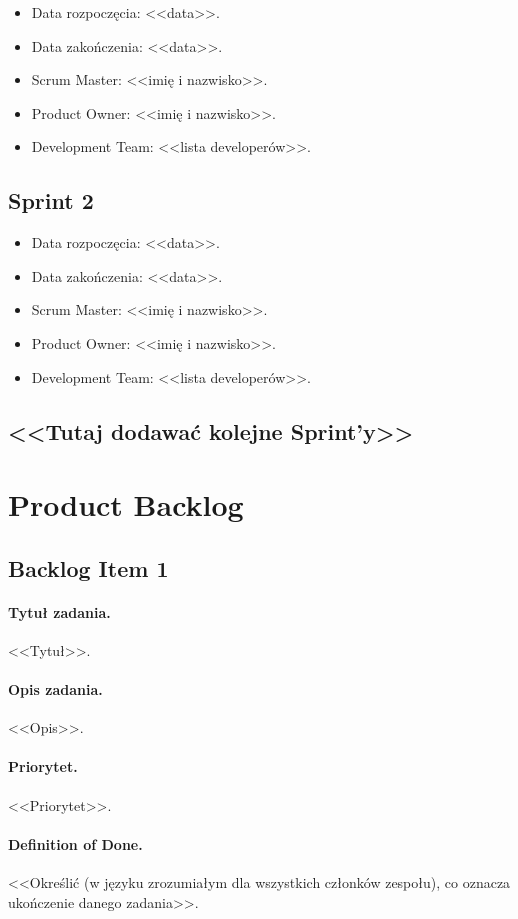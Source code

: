 \documentclass[a4paper]{article}
\begin{document}
\begin{itemize}
\item Data rozpoczęcia: <<data>>.
\item Data zakończenia: <<data>>.
\item Scrum Master: <<imię i nazwisko>>.
\item Product Owner: <<imię i nazwisko>>.
\item Development Team: <<lista developerów>>.
\end{itemize}

\subsection{Sprint 2}

\begin{itemize}
\item Data rozpoczęcia: <<data>>.
\item  Data zakończenia: <<data>>.
\item Scrum Master: <<imię i nazwisko>>.
\item Product Owner: <<imię i nazwisko>>.
\item Development Team: <<lista developerów>>.
\end{itemize}

\subsection*{<<Tutaj dodawać kolejne Sprint'y>>}

\section{Product Backlog}

\subsection{Backlog Item 1}
\paragraph{Tytuł zadania.} <<Tytuł>>.
\paragraph{Opis zadania.} <<Opis>>.
\paragraph{Priorytet.} <<Priorytet>>.
\paragraph{Definition of Done.} <<Określić (w języku zrozumiałym dla wszystkich członków zespołu), co oznacza ukończenie danego zadania>>.
\end{document}
